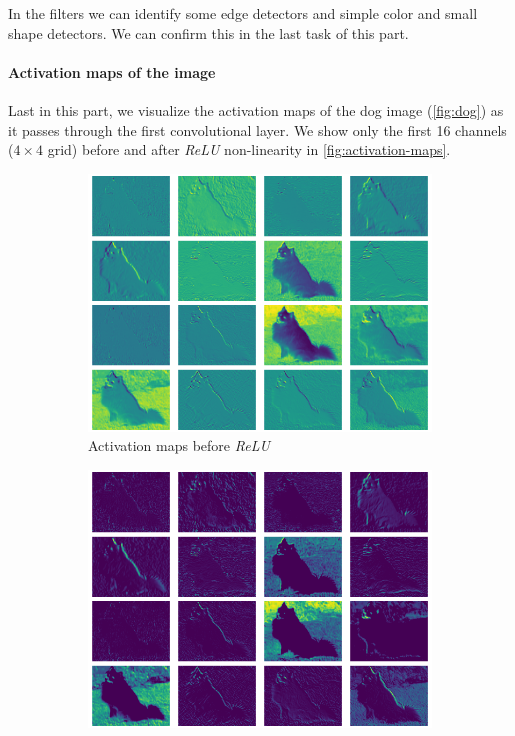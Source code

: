\documentclass[a4paper,11pt]{article}
\begin{document}
In the filters we can identify some edge detectors and simple color and small shape detectors.
We can confirm this in the last task of this part.

\paragraph*{Activation maps of the image} Last in this part, we visualize the activation maps of the dog image (\ref{fig:dog}) as it passes through the first convolutional layer.
We show only the first 16 channels ($4 \times 4$ grid) before and after \textit{ReLU} non-linearity in \ref{fig:activation-maps}.

\begin{figure}[ht]
    \centering
    \hfill
    \begin{subfigure}[b]{0.4\textwidth}
        \includegraphics[width=\textwidth]{../out/01_pass_first_layer.png}
        \caption{Activation maps before \textit{ReLU}}
    \end{subfigure}
    \hfill
    \begin{subfigure}[b]{0.4\textwidth}
        \includegraphics[width=\textwidth]{../out/01_pass_first_layer_activated.png}

\end{subfigure}
\end{figure}
\end{document}
